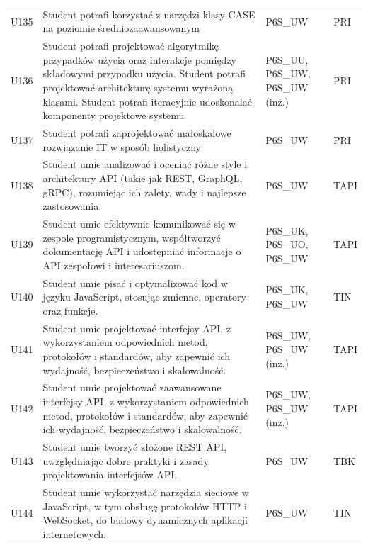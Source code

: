 \documentclass[12pt,a4paper]{article}
\begin{document}
{\begin{longtable}{m{1cm}m{8.8cm}m{2.1cm}m{2.5cm}}
\rowcolor{tableRowLight} U135 & Student potrafi korzystać z narzędzi klasy CASE na poziomie średniozaawansowanym & {\scriptsize P6S\_UW} & {\scriptsize PRI} \\
\rowcolor{tableRowAlt} U136 & Student potrafi projektować algorytmikę przypadków użycia oraz interakcje pomiędzy składowymi przypadku użycia. Student potrafi projektować architekturę systemu wyrażoną klasami. Student potrafi iteracyjnie udoskonalać komponenty projektowe systemu & {\scriptsize P6S\_UU, P6S\_UW, P6S\_UW {\scriptsize (inż.)}} & {\scriptsize PRI} \\
\rowcolor{tableRowLight} U137 & Student potrafi zaprojektować małoskalowe rozwiązanie IT w sposób holistyczny & {\scriptsize P6S\_UW} & {\scriptsize PRI} \\
\rowcolor{tableRowAlt} U138 & Student umie analizować i oceniać różne style i architektury API (takie jak REST, GraphQL, gRPC), rozumiejąc ich zalety, wady i najlepsze zastosowania. & {\scriptsize P6S\_UW} & {\scriptsize TAPI} \\
\rowcolor{tableRowLight} U139 & Student umie efektywnie komunikować się w zespole programistycznym, współtworzyć dokumentację API i udostępniać informacje o API zespołowi i interesariuszom. & {\scriptsize P6S\_UK, P6S\_UO, P6S\_UW} & {\scriptsize TAPI} \\
\rowcolor{tableRowAlt} U140 & Student umie pisać i optymalizować kod w języku JavaScript, stosując zmienne, operatory oraz funkcje. & {\scriptsize P6S\_UK, P6S\_UW} & {\scriptsize TIN} \\
\rowcolor{tableRowLight} U141 & Student umie projektować interfejsy API, z wykorzystaniem odpowiednich metod, protokołów i standardów, aby zapewnić ich wydajność, bezpieczeństwo i skalowalność. & {\scriptsize P6S\_UW, P6S\_UW {\scriptsize (inż.)}} & {\scriptsize TAPI} \\
\rowcolor{tableRowAlt} U142 & Student umie projektować zaawansowane interfejsy API, z wykorzystaniem odpowiednich metod, protokołów i standardów, aby zapewnić ich wydajność, bezpieczeństwo i skalowalność. & {\scriptsize P6S\_UW, P6S\_UW {\scriptsize (inż.)}} & {\scriptsize TAPI} \\
\rowcolor{tableRowLight} U143 & Student umie tworzyć złożone REST API, uwzględniając dobre praktyki i zasady projektowania interfejsów API. & {\scriptsize P6S\_UW} & {\scriptsize TBK} \\
\rowcolor{tableRowAlt} U144 & Student umie wykorzystać narzędzia sieciowe w JavaScript, w tym obsługę protokołów HTTP i WebSocket, do budowy dynamicznych aplikacji internetowych. & {\scriptsize P6S\_UW} & {\scriptsize TIN} \\

\end{longtable}}
\end{document}
